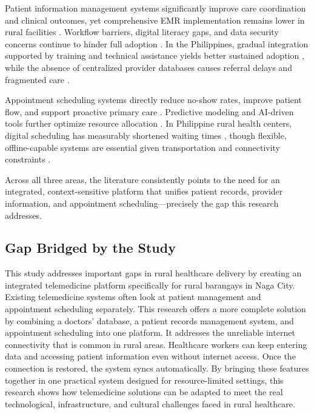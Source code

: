 \documentclass{research}
\begin{document}
Patient information management systems significantly improve care coordination and clinical
outcomes, yet comprehensive EMR implementation remains lower in rural facilities
\cite{Anzalone2025,DAmore2021}. Workflow barriers, digital literacy gaps, and data security
concerns continue to hinder full adoption \cite{Abdul2024,AdlerMilstein2023,Rhoades2025,Smith2021}.
In the Philippines, gradual integration supported by training and technical assistance yields
better sustained adoption \cite{Mendoza2023}, while the absence of centralized provider databases
causes referral delays and fragmented care \cite{Hernandez2022,Reyes2023}.

Appointment scheduling systems directly reduce no-show rates, improve patient flow, and support
proactive primary care \cite{Cusack2020,Betancor2024,Kucuk2024}. Predictive modeling and
AI-driven tools further optimize resource allocation \cite{Ferro2020,Dantas2018,Kucuk2024}. In
Philippine rural health centers, digital scheduling has measurably shortened waiting times
\cite{DelRosario2024}, though flexible, offline-capable systems are essential given transportation
and connectivity constraints \cite{Ramirez2021}.

Across all three areas, the literature consistently points to the need for an integrated,
context-sensitive platform that unifies patient records, provider information, and appointment
scheduling—precisely the gap this research addresses.

\subsection*{Gap Bridged by the Study}

This study addresses important gaps in rural healthcare delivery by creating an integrated
telemedicine platform specifically for rural barangays in Naga City. Existing telemedicine systems
often look at patient management and appointment scheduling separately. This research offers a more
complete solution by combining a doctors' database, a patient records management system, and
appointment scheduling into one platform. It addresses the unreliable internet connectivity that is
common in rural areas. Healthcare workers can keep entering data and accessing patient information
even without internet access. Once the connection is restored, the system syncs automatically. By
bringing these features together in one practical system designed for resource-limited settings,
this research shows how telemedicine solutions can be adapted to meet the real technological,
infrastructure, and cultural challenges faced in rural healthcare.
\end{document}
